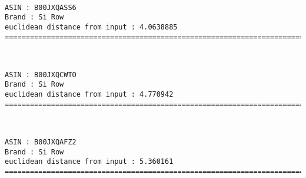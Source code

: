 \documentclass[11pt]{article}
\begin{document}
    \begin{center}
    \end{center}
    { \hspace*{\fill} \\}
    
    \begin{Verbatim}[commandchars=\\\{\}]
ASIN : B00JXQASS6
Brand : Si Row
euclidean distance from input : 4.0638885
=============================================================================================================================

    \end{Verbatim}

    \begin{center}
    \end{center}
    { \hspace*{\fill} \\}
    
    \begin{Verbatim}[commandchars=\\\{\}]
ASIN : B00JXQCWTO
Brand : Si Row
euclidean distance from input : 4.770942
=============================================================================================================================

    \end{Verbatim}

    \begin{center}
    \end{center}
    { \hspace*{\fill} \\}
    
    \begin{Verbatim}[commandchars=\\\{\}]
ASIN : B00JXQAFZ2
Brand : Si Row
euclidean distance from input : 5.360161
=============================================================================================================================

    \end{Verbatim}

    \begin{center}
    \end{center}
    { \hspace*{\fill} \\}
    
\end{document}
